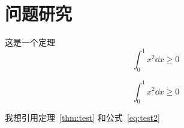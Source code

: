 \chapter{问题研究}

\begin{theorem}[Cauchy]\label{thm:test}
  这是一个定理
  \begin{equation}\label{eq:test1}
    \int_{0}^{1} x^2 \dd{x} \geq 0
  \end{equation}

  \begin{equation}\label{eq:test2}
    \int_{0}^{1} x^2 \dd{x} \geq 0
  \end{equation}
\end{theorem}

我想引用定理~\ref{thm:test} 和公式~\ref{eq:test2}